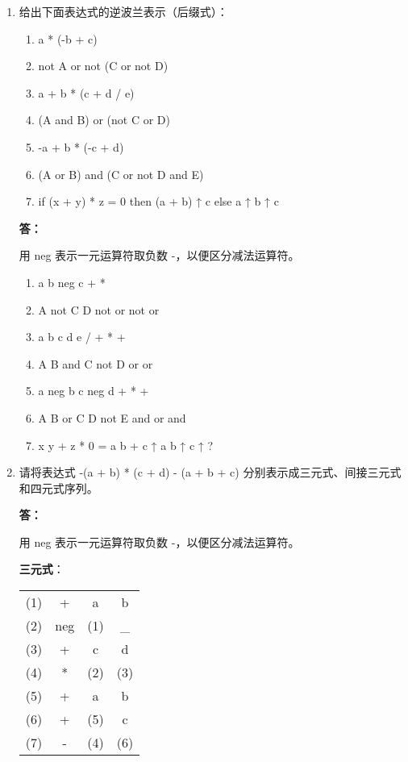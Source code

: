 \begin{enumerate}
    \item[1.] 给出下面表达式的逆波兰表示（后缀式）：
    
    \begin{enumerate}
        \item a * (-b + c)
        \item not A or not (C or not D)
        \item a + b * (c + d / e)
        \item (A and B) or (not C or D)
        \item -a + b * (-c + d)
        \item (A or B) and (C or not D and E)
        \item if (x + y) * z = 0 then (a + b) ↑ c else a ↑ b ↑ c
    \end{enumerate}
    
    \textbf{答：}
    
    用 neg 表示一元运算符取负数 -，以便区分减法运算符。
    
    \begin{enumerate}
        \item a b neg c + *
        \item A not C D not or not or
        \item a b c d e / + * +
        \item A B and C not D or or
        \item a neg b c neg d + * +
        \item A B or C D not E and or and
        \item x y + z * 0 = a b + c ↑ a b ↑ c ↑ ?
    \end{enumerate}
    
    \item[3.] 请将表达式 -(a + b) * (c + d) - (a + b + c) 分别表示成三元式、间接三元式和四元式序列。
    
    \textbf{答：}

    用 neg 表示一元运算符取负数 -，以便区分减法运算符。
    
    \textbf{三元式}：
        
    \begin{tabular}{cccc}
        (1) & + & a & b \\
        (2) & neg & (1) & _ \\
        (3) & + & c & d \\
        (4) & * & (2) & (3) \\
        (5) & + & a & b \\
        (6) & + & (5) & c \\
        (7) & - & (4) & (6)
    \end{tabular}
    

\end{enumerate}
